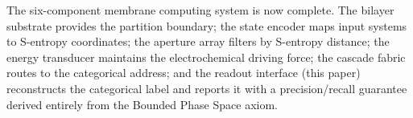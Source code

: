 \documentclass[11pt,twocolumn,a4paper]{article}
\theoremstyle{definition}
\theoremstyle{remark}
\begin{document}
The six-component membrane computing system is now complete. The bilayer
substrate \citep{companion1} provides the partition boundary; the state encoder
\citep{companion2} maps input systems to S-entropy coordinates; the aperture
array \citep{companion3} filters by S-entropy distance; the energy transducer
\citep{companion4} maintains the electrochemical driving force; the cascade
fabric \citep{companion5} routes to the categorical address; and the readout
interface (this paper) reconstructs the categorical label and reports it with
a precision/recall guarantee derived entirely from the Bounded Phase Space axiom.



\end{document}
